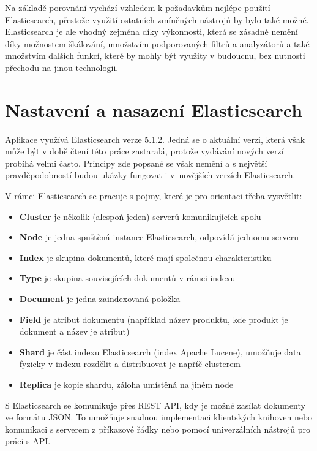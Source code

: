 \documentclass[FM,DP]{tulthesis}
\begin{document}
Na základě porovnání vychází vzhledem k požadavkům nejlépe použití Elasticsearch, 
přestože využití ostatních zmíněných nástrojů by bylo také možné. Elasticsearch
je ale vhodný zejména díky výkonnosti, která se zásadně nemění díky možnostem škálování, 
množstvím podporovaných filtrů a analyzátorů a také množstvím dalších funkcí, 
které by mohly být využity v budoucnu, bez nutnosti přechodu na jinou technologii.

\section{Nastavení a nasazení Elasticsearch}

Aplikace využívá Elasticsearch verze 5.1.2. Jedná se o aktuální verzi, která však
může být v době čtení této práce zastaralá, protože vydávání nových verzí probíhá
velmi často. Principy zde popsané se však nemění a s největší pravděpodobností 
budou ukázky fungovat i v~novějších verzích Elasticsearch.

V rámci Elasticsearch se pracuje s pojmy, které je pro orientaci třeba vysvětlit:

\begin{itemize}
\item \textbf{Cluster} je několik (alespoň jeden) serverů komunikujících spolu
\item \textbf{Node} je jedna spuštěná instance Elasticsearch, odpovídá jednomu serveru
\item \textbf{Index} je skupina dokumentů, které mají společnou charakteristiku
\item \textbf{Type} je skupina souvisejících dokumentů v rámci indexu
\item \textbf{Document} je jedna zaindexovaná položka
\item \textbf{Field} je atribut dokumentu (například název produktu, kde produkt je dokument a název je atribut)
\item \textbf{Shard} je část indexu Elasticsearch (index Apache Lucene), umožňuje data fyzicky
v indexu rozdělit a distribuovat je napříč clusterem
\item \textbf{Replica} je kopie shardu, záloha umístěná na jiném node
\end{itemize}

S Elasticsearch se komunikuje přes REST API, kdy je možné zasílat dokumenty ve formátu JSON.
To umožňuje snadnou implementaci klientských knihoven nebo komunikaci s serverem
z příkazové řádky nebo pomocí univerzálních nástrojů pro práci s API.
\end{document}
